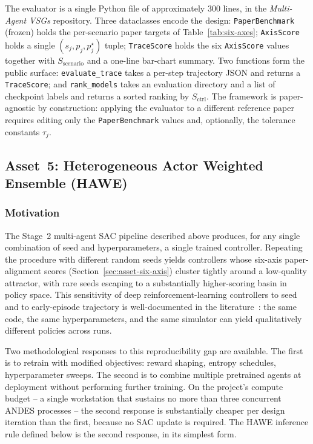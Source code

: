 \documentclass{unnc-fyp}
\begin{document}
The evaluator is a single Python file of approximately
$300$ lines,  in the
\textit{Multi-Agent VSGs} repository.
Three dataclasses encode the design:
\verb|PaperBenchmark| (frozen) holds the per-scenario paper
targets of Table~\ref{tab:six-axes};
\verb|AxisScore| holds a single $(s_j, p_j, p_j^{\star})$ tuple;
\verb|TraceScore| holds the six \verb|AxisScore| values together
with $S_\mathrm{scenario}$ and a one-line bar-chart summary.
Two functions form the public surface: \verb|evaluate_trace| takes
a per-step trajectory JSON and returns a \verb|TraceScore|; and
\verb|rank_models| takes an evaluation directory and a list of
checkpoint labels and returns a sorted ranking by
$S_\mathrm{ctrl}$.
The framework is paper-agnostic by construction: applying the
evaluator to a different reference paper requires editing only the
\verb|PaperBenchmark| values and, optionally, the tolerance
constants $\tau_j$.

\subsection{Asset~5: Heterogeneous Actor Weighted Ensemble (HAWE)}
\label{sec:asset-hawe}

\subsubsection{Motivation}

The Stage~2 multi-agent SAC pipeline described above produces, for
any single combination of seed and hyperparameters, a single
trained controller.
Repeating the procedure with different random seeds yields
controllers whose six-axis paper-alignment scores
(Section~\ref{sec:asset-six-axis}) cluster tightly around a
low-quality attractor, with rare seeds escaping to a substantially
higher-scoring basin in policy space.
This sensitivity of deep reinforcement-learning controllers to
seed and to early-episode trajectory is well-documented in the
literature~\cite{henderson2018deepreinforcement,
pineau2021reproducibility}: the same code, the same hyperparameters,
and the same simulator can yield qualitatively different policies
across runs.

Two methodological responses to this reproducibility gap are
available.
The first is to retrain with modified objectives: reward shaping,
entropy schedules, hyperparameter sweeps.
The second is to combine multiple pretrained agents at deployment
without performing further training.
On the project's compute budget -- a single workstation that
sustains no more than three concurrent ANDES processes -- the
second response is substantially cheaper per design iteration than
the first, because no SAC update is required.
The HAWE inference rule defined below is the second response, in
its simplest form.
\end{document}
